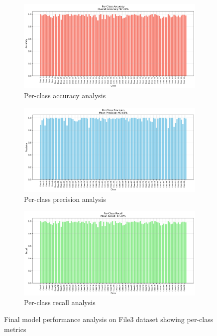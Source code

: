 \documentclass[conference]{IEEEtran}
\begin{document}
\begin{figure}[h]
    \centering
    \begin{subfigure}[b]{0.45\textwidth}
        \centering
        \includegraphics[width=\textwidth]{images/File3_final_analysis_accuracy.png}
        \caption{Per-class accuracy analysis}
        \label{fig:final_accuracy}
    \end{subfigure}
    \hfill
    \begin{subfigure}[b]{0.45\textwidth}
        \centering
        \includegraphics[width=\textwidth]{images/File3_final_analysis_precision.png}
        \caption{Per-class precision analysis}
        \label{fig:final_precision}
    \end{subfigure}
    
    \vspace{0.5cm}
    
    \begin{subfigure}[b]{0.45\textwidth}
        \centering
        \includegraphics[width=\textwidth]{images/File3_final_analysis_recall.png}
        \caption{Per-class recall analysis}
        \label{fig:final_recall}
    \end{subfigure}
    \caption{Final model performance analysis on File3 dataset showing per-class metrics}
    \label{fig:final_analysis}
\end{figure}
\end{document}
